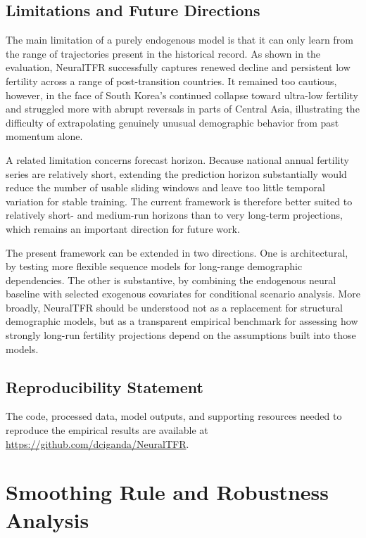 \documentclass[12pt]{article}
\begin{document}
\subsection*{Limitations and Future Directions}

The main limitation of a purely endogenous model is that it can only learn from the range of trajectories present in the historical record. As shown in the evaluation, NeuralTFR successfully captures renewed decline and persistent low fertility across a range of post-transition countries. It remained too cautious, however, in the face of South Korea's continued collapse toward ultra-low fertility and struggled more with abrupt reversals in parts of Central Asia, illustrating the difficulty of extrapolating genuinely unusual demographic behavior from past momentum alone.

A related limitation concerns forecast horizon. Because national annual fertility series are relatively short, extending the prediction horizon substantially would reduce the number of usable sliding windows and leave too little temporal variation for stable training. The current framework is therefore better suited to relatively short- and medium-run horizons than to very long-term projections, which remains an important direction for future work.

The present framework can be extended in two directions. One is architectural, by testing more flexible sequence models for long-range demographic dependencies. The other is substantive, by combining the endogenous neural baseline with selected exogenous covariates for conditional scenario analysis. More broadly, NeuralTFR should be understood not as a replacement for structural demographic models, but as a transparent empirical benchmark for assessing how strongly long-run fertility projections depend on the assumptions built into those models.

\subsection*{Reproducibility Statement}

The code, processed data, model outputs, and supporting resources needed to reproduce the empirical results are available at \url{https://github.com/dciganda/NeuralTFR}.

\appendix

\section{Smoothing Rule and Robustness Analysis}
\label{app:smoothing_ablation}
\end{document}
